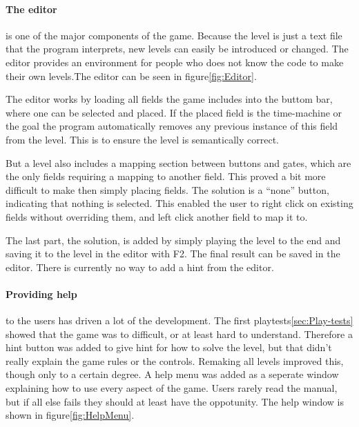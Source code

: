 \paragraph{The editor} is one of the major components of the game.
Because the level is just a text file that the program interprets, new
levels can easily be introduced or changed. The editor provides an
environment for people who does not know the code to make their own
levels.The editor can be seen in figure\ref{fig:Editor}.

The editor works by loading all fields the game includes into the
buttom bar, where one can be selected and placed. If the placed field
is the time-machine or the goal the program automatically removes any
previous instance of this field from the level.  This is to ensure the
level is semantically correct.

But a level also includes a mapping section between buttons and gates,
which are the only fields requiring a mapping to another field. This
proved a bit more difficult to make then simply placing fields. The
solution is a ``none'' button, indicating that nothing is
selected. This enabled the user to right click on existing fields
without overriding them, and left click another field to map it to.

The last part, the solution, is added by simply playing the level to the end
and saving it to the level in the editor with F2. The final result can be saved
in the editor. There is currently no way to add a hint from the editor.

\paragraph{Providing help} to the users has driven a lot of the development.
The first playtests\ref{sec:Play-tests} showed that the game was to difficult,
or at least hard to understand. Therefore a hint button was added to give
hint for how to solve the level, but that didn't really explain the game
rules or the controls. Remaking all levels improved this, though only to a
certain degree. A help menu was added as a seperate window explaining
how to use every aspect of the game. Users rarely read the manual, but if
all else fails they should at least have the oppotunity. The help window is
shown in figure\ref{fig:HelpMenu}.


